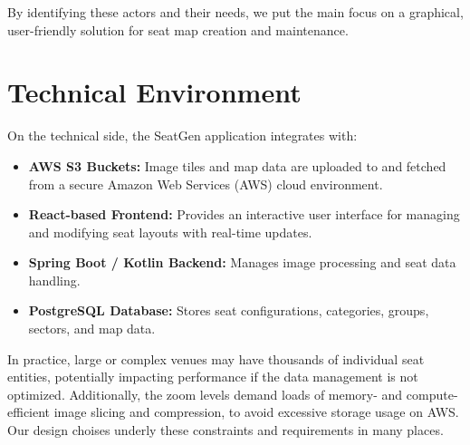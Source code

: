 By identifying these actors and their needs, we put the main focus on a graphical, user-friendly solution for seat map creation and maintenance.

\section{Technical Environment}
On the technical side, the SeatGen application integrates with:
\begin{itemize}
    \item \textbf{AWS S3 Buckets:} Image tiles and map data are uploaded to and fetched from a secure Amazon Web Services (AWS) cloud environment.
    \item \textbf{React-based Frontend:} Provides an interactive user interface for managing and modifying seat layouts with real-time updates.  
    \item \textbf{Spring Boot / Kotlin Backend:} Manages image processing and seat data handling.  
    \item \textbf{PostgreSQL Database:} Stores seat configurations, categories, groups, sectors, and map data.  
\end{itemize}

In practice, large or complex venues may have thousands of individual seat entities, potentially impacting performance if the data management is not optimized. Additionally, the zoom levels demand loads of memory- and compute-efficient image slicing and compression, to avoid excessive storage usage on AWS. Our design choises underly these constraints and requirements in many places.